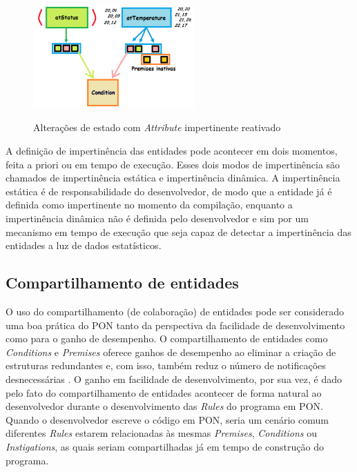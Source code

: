 \begin{figure}[!htb]
  \centering
  \caption{Alterações de estado com \textit{Attribute} impertinente reativado}
    \includegraphics[width=0.55\textwidth]{../figures/pr_imp_3.png}
  \smallskip
  \label{fig:pr_imp_3}
\end{figure}

\FloatBarrier

A definição de impertinência das entidades pode acontecer em dois momentos,
feita a priori ou em tempo de execução. Esses dois modos de impertinência são
chamados de impertinência estática e impertinência dinâmica. A impertinência
estática é de responsabilidade do desenvolvedor, de modo que a entidade já é
definida como impertinente no momento da compilação, enquanto a impertinência
dinâmica não é definida pelo desenvolvedor e sim por um mecanismo em tempo de
execução que seja capaz de detectar a impertinência das entidades a luz de dados
estatísticos.

\subsection{Compartilhamento de entidades}\label{sec:compartilhamento}

O uso do compartilhamento (de colaboração) de entidades pode ser considerado uma
boa prática do PON tanto da perspectiva da facilidade de desenvolvimento como
para o ganho de desempenho. O compartilhamento de entidades como
\textit{Conditions} e \textit{Premises} oferece ganhos de desempenho ao eliminar
a criação de estruturas redundantes e, com isso, também reduz o número de
notificações desnecessárias \cite{msc_Ronszcka_2012}. O ganho em facilidade de
desenvolvimento, por sua vez, é dado pelo fato do compartilhamento de entidades
acontecer de forma natural ao desenvolvedor durante o desenvolvimento das
\textit{Rules} do programa em PON. Quando o desenvolvedor escreve o código em
PON, seria um cenário comum diferentes \textit{Rules} estarem relacionadas às
mesmas \textit{Premises}, \textit{Conditions} ou \textit{Instigations}, as quais
seriam compartilhadas já em tempo de construção do programa.

